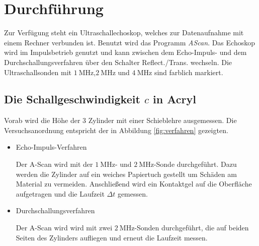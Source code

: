 \section{Durchf\"uhrung}
\label{sec:Durchfuehrung}
Zur Verfügung steht ein Ultraschallechoskop, welches zur Datenaufnahme mit einem Rechner verbunden ist. Benutzt wird das Programm \emph{AScan}. Das Echoskop wird im Impulsbetrieb genutzt und kann zwischen dem Echo-Impuls- und dem Durchschallungsverfahren über den Schalter Reflect./Trans. wechseln.
Die Ultraschallsonden mit $\SI{1}{\mega\hertz}$,$\SI{2}{\mega\hertz}$ und $\SI{4}{\mega\hertz}$ sind farblich markiert.

\subsection{Die Schallgeschwindigkeit $c$ in Acryl}
Vorab wird die Höhe der 3 Zylinder mit einer Schieblehre ausgemessen. Die Versuchsanordnung entspricht der in Abbildung \ref{fig:verfahren} gezeigten.
\begin{itemize}
\item{Echo-Impuls-Verfahren}

Der A-Scan wird mit der $\SI{1}{\mega\hertz}$- und $\SI{2}{\mega\hertz}$-Sonde durchgeführt. Dazu werden die Zylinder auf ein weiches Papiertuch gestellt um Schäden am Material zu vermeiden. Anschließend wird ein Kontaktgel auf die Oberfläche aufgetragen und die Laufzeit $\Delta{t}$ gemessen.
\item{Durchschallungsverfahren}

Der A-Scan wird wird mit zwei $\SI{2}{\mega\hertz}$-Sonden durchgeführt, die auf beiden Seiten des Zylinders aufliegen und erneut die Laufzeit messen.
\end{itemize} 
